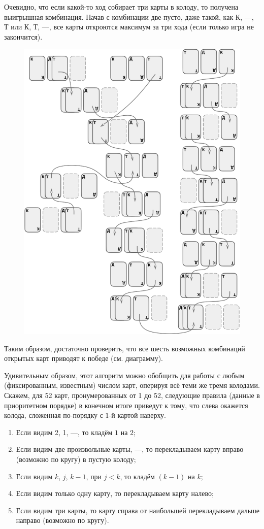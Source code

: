 Очевидно, что если какой-то ход собирает три карты в колоду, то получена выигрышная комбинация.
Начав с комбинации две-пусто, даже такой, как К, ---, Т или
К, Т, ---, все карты откроются максимум за три хода (если только игра не закончится).
\begin{figure}[h!]
\centering
\includegraphics[scale=0.55]{Figs/Handicaps/conway-ru}
\end{figure}
Таким образом, достаточно проверить, что все шесть возможных комбинаций открытых карт приводят к победе  (см. диаграмму).
\heart

Удивительным образом, этот алгоритм можно обобщить для работы с любым (фиксированным, известным) числом карт, оперируя всё теми же тремя колодами.
Скажем, для 52 карт, пронумерованных от 1 до 52, следующие правила (данные в приоритетном порядке) в конечном итоге приведут к тому, что слева окажется колода, сложенная по-порядку с $1$-й картой наверху.

\begin{enumerate}[(1)]
\item Если видим 2, 1, ---, то кладём $1$ на $2$;
\item Если видим две произвольные карты, ---, то перекладываем карту вправо (возможно по кругу) в пустую колоду;
\item Если видим $k$, $j$, $k-1$, при $j < k$, то кладём $(k-1)$ на $k$;
\item Если видим только одну карту, то перекладываем карту налево;
\item Если видим три карты, то карту справа от наибольшей перекладываем дальше направо (возможно по кругу).
\end{enumerate}

